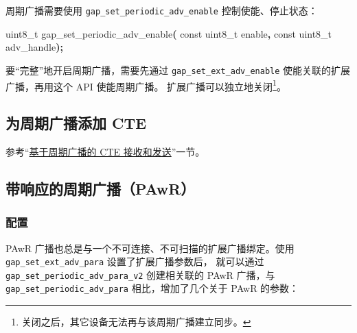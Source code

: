\documentclass[
  12pt,
]{book}
\newenvironment{Shaded}{\begin{snugshade}}{\end{snugshade}}
\newcommand{\DataTypeTok}[1]{\textcolor[rgb]{0.13,0.29,0.53}{#1}}
\newcommand{\NormalTok}[1]{#1}
\newcommand{\OperatorTok}[1]{\textcolor[rgb]{0.81,0.36,0.00}{\textbf{#1}}}
\begin{document}
周期广播需要使用 \texttt{gap\_set\_periodic\_adv\_enable} 控制使能、停止状态：

\begin{Shaded}
\begin{Highlighting}[]
\DataTypeTok{uint8\_t}\NormalTok{ gap\_set\_periodic\_adv\_enable}\OperatorTok{(}
  \DataTypeTok{const} \DataTypeTok{uint8\_t}\NormalTok{ enable}\OperatorTok{,}
  \DataTypeTok{const} \DataTypeTok{uint8\_t}\NormalTok{ adv\_handle}\OperatorTok{);}
\end{Highlighting}
\end{Shaded}

要``完整''地开启周期广播，需要先通过 \texttt{gap\_set\_ext\_adv\_enable} 使能关联的扩展广播，再用这个 API 使能周期广播。
扩展广播可以独立地关闭\footnote{关闭之后，其它设备无法再与该周期广播建立同步。}。

\hypertarget{ux4e3aux5468ux671fux5e7fux64adux6dfbux52a0-cte}{%
\subsection{为周期广播添加 CTE}\label{ux4e3aux5468ux671fux5e7fux64adux6dfbux52a0-cte}}

参考``\protect\hyperlink{misc-cte-periodic-adv}{基于周期广播的 CTE 接收和发送}''一节。

\hypertarget{ux5e26ux54cdux5e94ux7684ux5468ux671fux5e7fux64adpawr-1}{%
\subsection{带响应的周期广播（PAwR）}\label{ux5e26ux54cdux5e94ux7684ux5468ux671fux5e7fux64adpawr-1}}

\hypertarget{ux914dux7f6e}{%
\subsubsection{配置}\label{ux914dux7f6e}}

PAwR 广播也总是与一个不可连接、不可扫描的扩展广播绑定。使用 \texttt{gap\_set\_ext\_adv\_para} 设置了扩展广播参数后，
就可以通过 \texttt{gap\_set\_periodic\_adv\_para\_v2} 创建相关联的 PAwR 广播，与 \texttt{gap\_set\_periodic\_adv\_para}
相比，增加了几个关于 PAwR 的参数：
\end{document}
